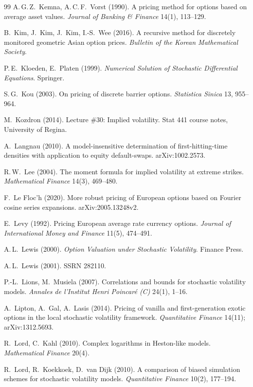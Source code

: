 \begin{thebibliography}{99}
A.\,G.\,Z.~Kemna, A.\,C.\,F.~Vorst (1990).
A pricing method for options based on average asset values.
\emph{Journal of Banking \& Finance} 14(1), 113--129.

B.~Kim, J.~Kim, J.~Kim, I.-S.~Wee (2016).
A recursive method for discretely monitored geometric Asian option prices.
\emph{Bulletin of the Korean Mathematical Society}.

P.\,E.~Kloeden, E.~Platen (1999).
\emph{Numerical Solution of Stochastic Differential Equations}.
Springer.

S.\,G.~Kou (2003).
On pricing of discrete barrier options.
\emph{Statistica Sinica} 13, 955--964.

M.~Kozdron (2014).
Lecture \#30: Implied volatility.
Stat 441 course notes, University of Regina.

A.~Langnau (2010).
A model-insensitive determination of first-hitting-time densities with application to equity default-swaps.
arXiv:1002.2573.

R.\,W.~Lee (2004).
The moment formula for implied volatility at extreme strikes.
\emph{Mathematical Finance} 14(3), 469--480.

F.~Le Floc'h (2020).
More robust pricing of European options based on Fourier cosine series expansions.
arXiv:2005.13248v2.

E.~Levy (1992).
Pricing European average rate currency options.
\emph{Journal of International Money and Finance} 11(5), 474--491.

A.\,L.~Lewis (2000).
\emph{Option Valuation under Stochastic Volatility}.
Finance Press.

A.\,L.~Lewis (2001).
SSRN 282110.

P.-L.~Lions, M.~Musiela (2007).
Correlations and bounds for stochastic volatility models.
\emph{Annales de l'Institut Henri Poincaré (C)} 24(1), 1--16.

A.~Lipton, A.~Gal, A.~Lasis (2014).
Pricing of vanilla and first-generation exotic options in the local stochastic volatility framework.
\emph{Quantitative Finance} 14(11); arXiv:1312.5693.

R.~Lord, C.~Kahl (2010).
Complex logarithms in Heston-like models.
\emph{Mathematical Finance} 20(4).

R.~Lord, R.~Koekkoek, D.~van Dijk (2010).
A comparison of biased simulation schemes for stochastic volatility models.
\emph{Quantitative Finance} 10(2), 177--194.


\end{thebibliography}
